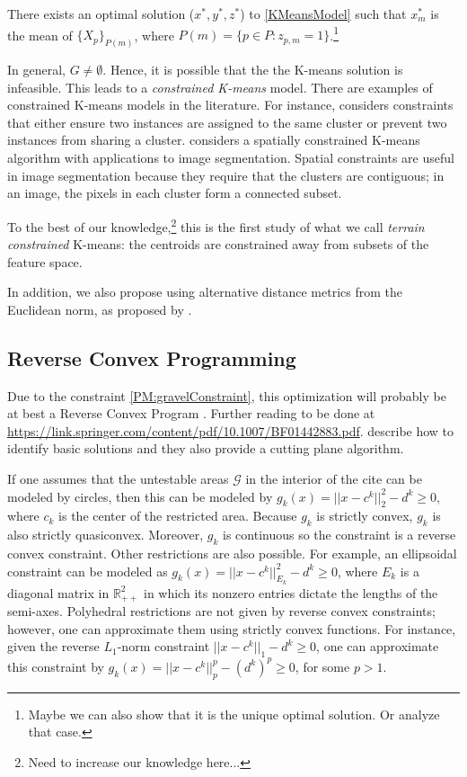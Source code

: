 \begin{conjecture}
There exists an optimal solution ($x^{*}, y^{*}, z^{*}$) to \eqref{KMeansModel} such that $x^{*}_{m}$ is the mean of $\{X_{p}\}_{P(m)}$, where $P(m) = \{p \in P : z_{p,m} = 1\}$.\footnote{Maybe we can also show that it is the unique optimal solution. Or analyze that case.}
\end{conjecture}

In general, $G \neq \emptyset$. Hence, it is possible that the the K-means solution is infeasible. This leads to a \textit{constrained K-means} model. There are examples of constrained K-means models in the literature. For instance, \citep{Wagstaff2001} considers constraints that either ensure two instances are assigned to the same cluster or  prevent two instances from sharing a cluster. \citep{Luo2003} considers a spatially constrained K-means algorithm with applications to image segmentation. Spatial constraints are useful in image segmentation because they require that the clusters are contiguous; in an image, the pixels in each cluster form a connected subset.

To the best of our knowledge,\footnote{Need to increase our knowledge here...} this is the first study of what we call \textit{terrain constrained} K-means: the centroids are constrained away from subsets of the feature space.

In addition, we also propose using alternative distance metrics from the Euclidean norm, as proposed by \citep{Aggarwal2001}.

\subsection{Reverse Convex Programming}
Due to the constraint \eqref{PM:gravelConstraint}, this optimization will probably be at best a Reverse Convex Program \citep{Hillestad1980}. Further reading to be done at \url{https://link.springer.com/content/pdf/10.1007/BF01442883.pdf}. \cite{Hillestad1980} describe how to identify basic solutions and they also provide a cutting plane algorithm.

If one assumes that the untestable areas $\mathcal{G}$ in the interior of the cite can be modeled by circles, then this can be modeled by $g_{k}(x) = ||x - c^{k}||_{2}^{2} - d^{k} \geq 0$, where $c_{k}$ is the center of the restricted area. Because $g_{k}$ is strictly convex, $g_{k}$ is also strictly quasiconvex. Moreover, $g_{k}$ is continuous so the constraint is a reverse convex constraint. Other restrictions are also possible. For example, an ellipsoidal constraint can be modeled as $g_{k}(x) = ||x - c^{k}||_{E_{k}}^{2} - d^{k} \geq 0$, where $E_{k}$ is a diagonal matrix in $\mathbb{R}^{2}_{++}$ in which its nonzero entries dictate the lengths of the semi-axes. Polyhedral restrictions are not given by reverse convex constraints; however, one can approximate them using strictly convex functions. For instance, given the reverse $L_{1}$-norm constraint $||x - c^{k}||_{1} - d^{k} \geq 0$, one can approximate this constraint by $g_{k}(x) = ||x - c^{k}||_{p}^{p} - (d^{k})^{p} \geq 0$, for some $p > 1$.

